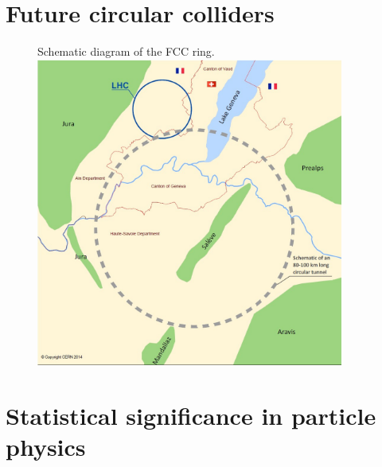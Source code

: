 \section{Future circular colliders}

\begin{figure}[h]
  \begin{sidecaption}
    {Schematic diagram of the FCC ring.}
    \centering
  \includegraphics[width=0.9\textwidth]{images/FCC_ring_schematic}
  \end{sidecaption}
\end{figure}
\section{Statistical significance in particle physics}
